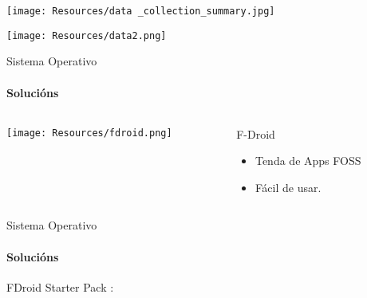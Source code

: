 \documentclass{beamer}
\begin{document}
\begin{frame}

  \texttt{[image: Resources/data \_collection\_summary.jpg]}

\end{frame}

\begin{frame}

  \texttt{[image: Resources/data2.png]}

\end{frame}



\begin{frame}{Sistema Operativo}
  \framesubtitle{Solucións}

  \begin{columns}
    \begin{column}{0.5\textwidth}
      \texttt{[image: Resources/fdroid.png]}


    \end{column}

    \begin{column}{0.4\textwidth}
      \begin{block}{F-Droid}
        \begin{itemize}
          \item Tenda de Apps FOSS
          \item Fácil de usar.
        \end{itemize}
      \end{block}

    \end{column}

  \end{columns}

\end{frame}



\begin{frame}{Sistema Operativo}
  \framesubtitle{Solucións}

  FDroid Starter Pack :\quad

\end{frame}
\end{document}
